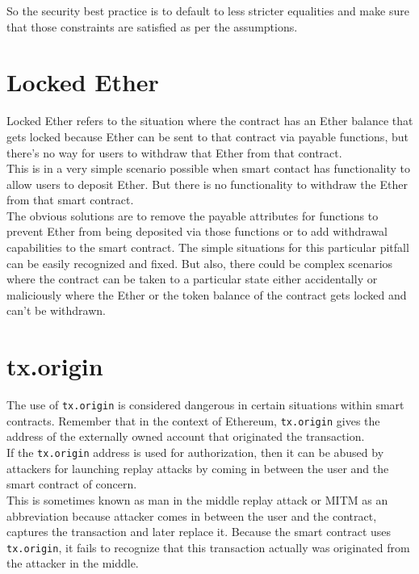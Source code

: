 So the security best practice is to default to less stricter equalities and make sure that those constraints are satisfied as per the assumptions.

\section{Locked Ether}

Locked Ether refers to the situation where the contract has an Ether balance that gets locked because Ether can be sent to that contract via payable functions, but there's no way for users to withdraw that Ether from that contract. \\

This is in a very simple scenario possible when smart contact has functionality to allow users to deposit Ether. But there is no functionality to withdraw the Ether from that smart contract.\\

The obvious solutions are to remove the payable attributes for functions to prevent Ether from being deposited via those functions or to add withdrawal capabilities to the smart contract. The simple situations for this particular pitfall can be easily recognized and fixed. But also, there could be complex scenarios where the contract can be taken to a particular state either accidentally or maliciously where the Ether or the token balance of the contract gets locked and can't be withdrawn.

\section{tx.origin}

The use of \texttt{tx.origin} is considered dangerous in certain situations within smart contracts. Remember that in the context of Ethereum, \texttt{tx.origin} gives the address of the externally owned account that originated the transaction. \\

If the \texttt{tx.origin} address is used for authorization, then it can be abused by attackers for launching replay attacks by coming in between the user and the smart contract of concern.\\

This is sometimes known as man in the middle replay attack or MITM as an abbreviation because attacker comes in between the user and the contract, captures the transaction and later replace it. Because the smart contract uses \texttt{tx.origin}, it fails to recognize that this transaction actually was originated from the attacker in the middle. \\

